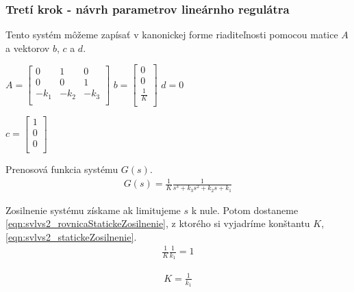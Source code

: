 \documentclass[../main.tex]{subfiles}
\begin{document}
\subsubsection{Tretí krok - návrh parametrov lineárnho regulátra}
Tento systém môžeme zapísať v kanonickej forme riaditeľnosti pomocou matice $A$ a vektorov $b$, $c$ a $d$.
        \begin{center}
		$ A = 
			\begin{bmatrix} 
			0 & 1 & 0 \\ 
			0 & 0 & 1 \\ 
			-k_1 & -k_2 & -k_3  \\ 
			\end{bmatrix}$
		$ b = 
			\begin{bmatrix} 
			0 \\ 
			0 \\ 
			\frac{1}{K}  \\ 
			\end{bmatrix}$
		$ d = 0$

		$ c = 
			\begin{bmatrix} 
			1 \\ 0 \\ 0  \\
			\end{bmatrix}$
        \end{center}
Prenosová funkcia systému $G(s)$.
	\begin{equation}
		\begin{aligned}
		G(s) = \frac{1}{K}\frac{1}{s^3+k_3s^2+k_2s+k_1}
		\end{aligned}
		\label{eqn:svlvs2_linearnySystemPrenos}
	\end{equation}

Zosilnenie systému získame ak limitujeme $s$ k nule. Potom dostaneme \cref{eqn:svlvs2_rovnicaStatickeZosilnenie}, z ktorého si vyjadríme konštantu $K$,  \cref{eqn:svlvs2_statickeZosilnenie}.
	\begin{equation}
		\begin{aligned}
		\frac{1}{K}\frac{1}{k_1} = 1
		\end{aligned}
		\label{eqn:svlvs2_rovnicaStatickeZosilnenie}
	\end{equation}

	\begin{equation}
		\begin{aligned}
		K = \frac{1}{k_1}
		\end{aligned}
		\label{eqn:svlvs2_statickeZosilnenie}
	\end{equation}
\end{document}
